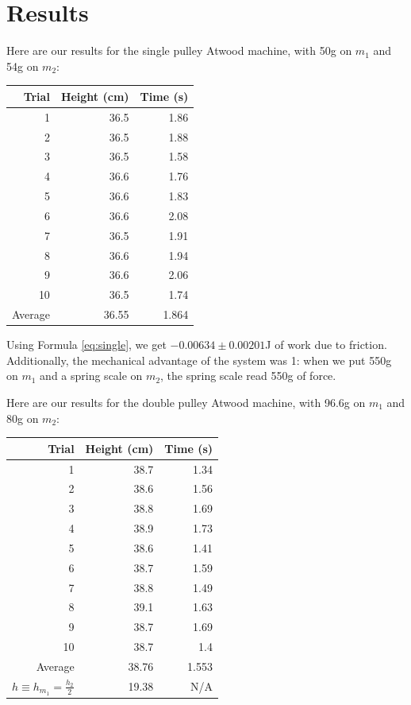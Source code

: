 \documentclass[12pt]{article}
\begin{document}
\section{Results}
\label{sec:orgcf35af2}

Here are our results for the single pulley Atwood machine, with 50g on \(m_1\) and 54g on \(m_2\):

\begin{center}
\begin{tabular}{r|r|r}
Trial & Height (cm) & Time (s)\\
\hline
1 & 36.5 & 1.86\\
2 & 36.5 & 1.88\\
3 & 36.5 & 1.58\\
4 & 36.6 & 1.76\\
5 & 36.6 & 1.83\\
6 & 36.6 & 2.08\\
7 & 36.5 & 1.91\\
8 & 36.6 & 1.94\\
9 & 36.6 & 2.06\\
10 & 36.5 & 1.74\\
\hline
Average & 36.55 & 1.864\\
\end{tabular}
\end{center}

Using Formula \ref{eq:single}, we get \(-0.00634 \pm 0.00201\)J of work due to friction. Additionally, the mechanical advantage of the system was 1: when we put 550g on \(m_1\) and a spring scale on \(m_2\), the spring scale read 550g of force.

Here are our results for the double pulley Atwood machine, with 96.6g on \(m_1\) and 80g on \(m_2\):

\begin{center}
\begin{tabular}{r|r|r}
Trial & Height (cm) & Time (s)\\
\hline
1 & 38.7 & 1.34\\
2 & 38.6 & 1.56\\
3 & 38.8 & 1.69\\
4 & 38.9 & 1.73\\
5 & 38.6 & 1.41\\
6 & 38.7 & 1.59\\
7 & 38.8 & 1.49\\
8 & 39.1 & 1.63\\
9 & 38.7 & 1.69\\
10 & 38.7 & 1.4\\
\hline
Average & 38.76 & 1.553\\
\(h \equiv h_{m_1} = \frac{h_{2}}{2}\) & 19.38 & N/A\\
\end{tabular}
\end{center}
\end{document}
